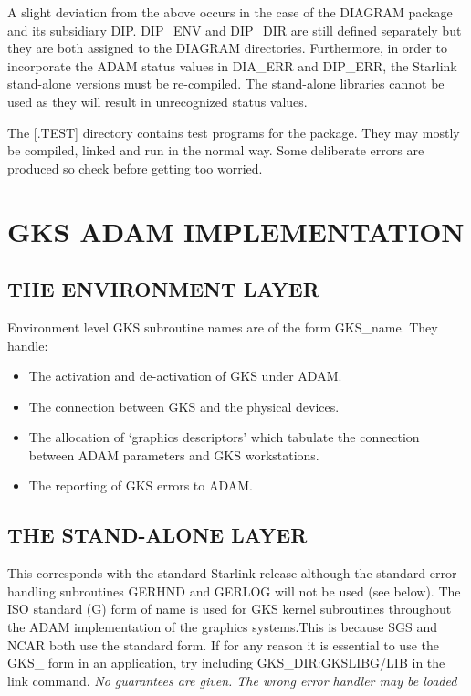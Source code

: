 A slight deviation from the above occurs in the case of the DIAGRAM package
and its subsidiary DIP.
DIP\_ENV and DIP\_DIR are still defined separately
but they are both assigned to the DIAGRAM directories. Furthermore, in order
to incorporate the ADAM status values in DIA\_ERR and DIP\_ERR, the Starlink
stand-alone versions must
be re-compiled. The stand-alone libraries cannot be used as they will result
in unrecognized status values.

The [.TEST] directory contains test programs for the package.
They may mostly be compiled, linked and run in the normal way. 
Some deliberate errors are produced so check before getting too worried.

\section{GKS ADAM IMPLEMENTATION}

\subsection{THE ENVIRONMENT LAYER}
 Environment level GKS subroutine names are of the
form GKS\_name. They handle:
\begin{itemize}
\item The activation and de-activation of GKS under ADAM.
\item The connection between GKS and the physical devices.
\item The allocation of `graphics descriptors' which tabulate the connection 
between ADAM parameters and GKS workstations.
\item The reporting of GKS errors to ADAM.
\end{itemize}

\subsection{THE STAND-ALONE LAYER}
This corresponds with the standard Starlink release although the standard
error handling subroutines GERHND and GERLOG will not be used (see below).
The ISO standard (G) form of name is used for GKS kernel subroutines throughout 
the ADAM implementation
of the graphics systems.This is because SGS and NCAR both use the standard form.
If for any reason it is
essential to use the GKS\_ form in an application, try including
GKS\_DIR:GKSLIBG/LIB in the link command. 
{\em No guarantees are given. The wrong error handler may be loaded}

